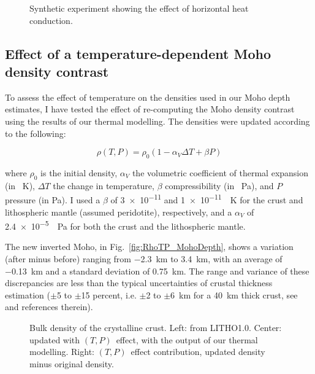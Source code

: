 \begin{subappendices}
\begin{figure}
	\begin{adjustbox}{center}
	\end{adjustbox}
	\caption[Synthetic experiment showing the effect of horizontal heat conduction.]{Synthetic experiment showing the effect of horizontal heat conduction.}
	\label{fig:2Deff}
\end{figure}

\FloatBarrier

\subsection{Effect of a temperature-dependent Moho density contrast}
\label{ss:ApplSup:MethodTests:MohoDeltaRho}

To assess the effect of temperature on the densities used in our Moho depth estimates, I have tested the effect of re-computing the Moho density contrast using the results of our thermal modelling.
The densities were updated according to the following:

\begin{equation*}
    \rho(T,P) = \rho_0 (1 - \alpha_V \Delta T + \beta P) 
\end{equation*}

where $\rho_0$ is the initial density, $\alpha_V$ the volumetric coefficient of thermal expansion (in \si{\per \kelvin}), $\Delta T$ the change in temperature, $\beta$ compressibility (in \si{\per \pascal}), and $P$ pressure (in \si{\pascal}). I used a $\beta$ of \num{3e-11} and \SI{1e-11}{\per \kelvin} for the crust and lithospheric mantle (assumed peridotite), respectively, and a $\alpha_V$ of \SI{2.4e-5}{\per \pascal} for both the crust and the lithospheric mantle.

The new inverted Moho, in Fig.~\ref{fig:RhoTP_MohoDepth}, shows a variation (after minus before) ranging from \SI{-2.3}{\kilo \metre} to \SI[retain-explicit-plus]{+3.4}{\kilo \metre}, with an average of \SI{-0.13}{\kilo \metre} and a standard deviation of \SI{0.75}{\kilo \metre}.
The range and variance of these discrepancies are less than the typical uncertainties of crustal thickness estimation ($\pm$\num{5} to $\pm$\num{15} percent, i.e. $\pm$\num{2} to $\pm$\SI{6}{\kilo \metre} for a \SI{40}{\kilo \metre} thick crust, see \cite{Grad2009} and references therein).

\begin{figure}
	\begin{adjustbox}{center}
	\end{adjustbox}
	\caption[Bulk density of the crystalline crust, effect of temperature dependence.]{Bulk density of the crystalline crust.
	Left: from LITHO1.0.
	Center: updated with $(T,P)$~effect, with the output of our thermal modelling. 
	Right: $(T,P)$~effect contribution, updated density minus original density.}
	\label{fig:RhoTP_RhoC}
\end{figure}


\end{subappendices}
